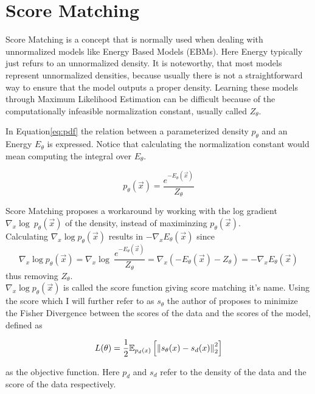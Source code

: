 \section{Score Matching}
\label{sec:sm}

Score Matching \cite{sm} is a concept that is normally used when dealing with unnormalized models like Energy Based Models (EBMs). Here 
Energy typically just refurs to an unnormalized density. It is noteworthy, that most models represent unnormalized densities, 
because usually there is not a straightforward way to ensure that the model outputs a proper density.
Learning these models through Maximum Likelihood Estimation can be difficult because of the computationally infeasible normalization 
constant, usually called $Z_\theta$.


In Equation\ref{eq:pdf} the relation between a parameterized density $p_\theta$ and an Energy $E_\theta$ is expressed. Notice that calculating the normalization constant would 
mean computing the integral over $E_\theta$.

\begin{equation}
    \label{eq:pdf}
    p_\theta(\vec x) = \frac{e^{-E_\theta(\vec x)}}{Z_\theta}
\end{equation}

Score Matching proposes a workaround by working with the log gradient $\nabla_x \log \ p_\theta(\vec x)$ of the density, 
instead of maximinzing $p_\theta(\vec x)$. \\

Calculating $\nabla_x \log p_\theta(\vec x)$ results in $- \nabla_x E_\theta(\vec x)$ since 
\[\nabla_x \log p_\theta(\vec x) = \nabla_x \log \ \frac{e^{- E_\theta(\vec x)}}{Z_\theta} = \nabla_x \left( - E_\theta(\vec x) - {Z_\theta} \right) = - \nabla_x E_\theta(\vec x)\]
thus removing $Z_\theta$.\\

$\nabla_x \log p_\theta(\vec x)$ is called the score function giving score matching it's name.
Using the score which I will further refer to as $s_\theta$ the author of \cite{sm} proposes to minimize the Fisher Divergence between 
the scores of the data and the scores of the model, defined as 

\begin{equation}
    L(\theta) = \frac{1}{2} \mathbb{E}_{p_d(x)} \left[ \left\lVert s_\theta(x) - s_d(x)\right\rVert^2_2 \right]
\end{equation}

as the objective function. Here $p_d$ and $s_d$ refer to the density of the data and the score of the data respectively.

